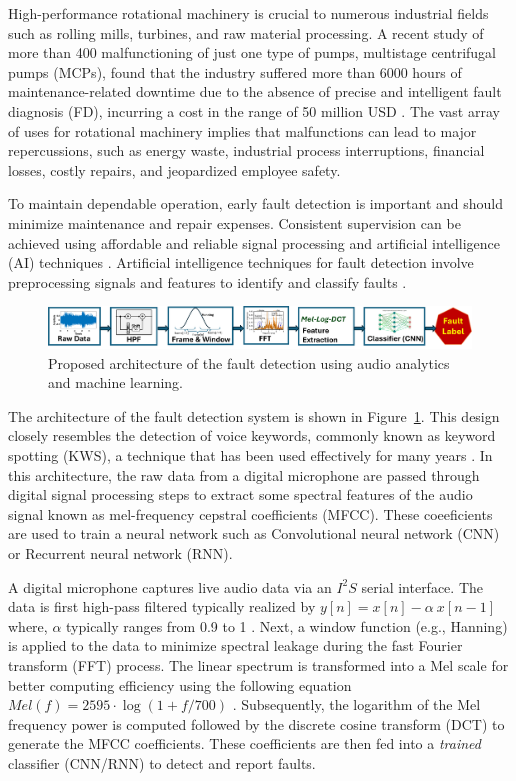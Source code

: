 \documentclass[12pt]{article}
\begin{document}
High-performance rotational machinery is crucial to numerous industrial fields such as rolling mills, turbines, and raw material processing.
A recent study of more than 400 malfunctioning of just one type of pumps, multistage centrifugal pumps (MCPs), found that the industry suffered more than 6000 hours of maintenance-related downtime due to the absence of precise and intelligent fault diagnosis (FD), incurring a cost in the range of 50 million USD \cite{rane2021re}.
The vast array of uses for rotational machinery implies that malfunctions can lead to major repercussions, such as energy waste, industrial process interruptions, financial losses, costly repairs, and jeopardized employee safety. 

To maintain dependable operation, early fault detection is important and should minimize maintenance and repair expenses. Consistent supervision can be achieved using affordable and reliable signal processing and artificial intelligence (AI) techniques \cite{sunal2022review}. Artificial intelligence techniques for fault detection involve preprocessing signals and features to identify and classify faults \cite{saeed2021fault, jiang2019bearing}.

\begin{figure}[htb]
\centering
\includegraphics[width=1.0\linewidth]{figs/fig-arch1.png}
\caption{\label{fig:arch1}Proposed architecture of the fault detection using audio analytics and machine learning.}
\end{figure}

The architecture of the fault detection system is shown in Figure~\ref{fig:arch1}. This design closely resembles the detection of voice keywords, commonly known as keyword spotting (KWS), a technique that has been used effectively for many years \cite{chong20220}.
In this architecture, the raw data from a digital microphone are passed through digital signal processing steps to extract some spectral features of the audio signal known as mel-frequency cepstral coefficients (MFCC). These coeeficients are used to train a neural network such as Convolutional neural network (CNN) or Recurrent neural network (RNN). 

A digital microphone captures live audio data via an $I^2S$ serial interface. The data is first high-pass filtered typically realized by $y[n] = x[n] - \alpha~x[n-1]$ where, $\alpha$ typically ranges from 0.9 to 1 \cite{han2006efficient}.
Next, a window function (e.g., Hanning) is applied to the data to minimize spectral leakage during the fast Fourier transform (FFT) process. The linear spectrum is transformed into a Mel scale for better computing efficiency using the following equation $Mel(f) = 2595\cdot \log(1 + f/700)$ \cite{han2006efficient}.
Subsequently, the logarithm of the Mel frequency power is computed followed by the discrete cosine transform (DCT) to generate the MFCC coefficients. These coefficients are then fed into a \textit{trained} classifier (CNN/RNN) to detect and report faults.
\end{document}
